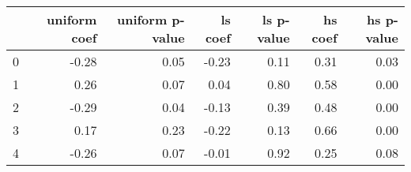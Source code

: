 \begin{tabular}{lrrrrrr}
\toprule
 & uniform coef & uniform p-value & ls coef & ls p-value & hs coef & hs p-value \\
\midrule
0 & -0.28 & 0.05 & -0.23 & 0.11 & 0.31 & 0.03 \\
1 & 0.26 & 0.07 & 0.04 & 0.80 & 0.58 & 0.00 \\
2 & -0.29 & 0.04 & -0.13 & 0.39 & 0.48 & 0.00 \\
3 & 0.17 & 0.23 & -0.22 & 0.13 & 0.66 & 0.00 \\
4 & -0.26 & 0.07 & -0.01 & 0.92 & 0.25 & 0.08 \\
\bottomrule
\end{tabular}
